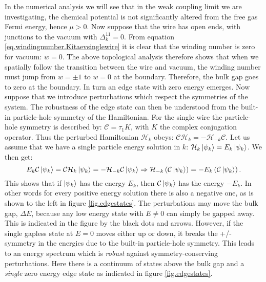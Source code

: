 In the numerical analysis we will see that in the weak coupling limit we are investigating, the chemical potential is not significantly altered from the free gas Fermi energy, hence $\mu > 0$. Now suppose that the wire has open ends, with junctions to the vacuum with $\Delta^{11}_k = 0$. From equation \eqref{eq.windingnumber.Kitaevsinglewire} it is clear that the winding number is zero for vacuum: $w = 0$. The above topological analysis therefore shows that when we spatially follow the transition between the wire and vacuum, the winding number must jump from $w = \pm 1$ to $w = 0$ at the boundary. Therefore, the bulk gap goes to zero at the boundary. In turn an edge state with zero energy emerges. Now suppose that we introduce perturbations which respect the symmetries of the system. The robustness of the edge state can then be understood from the built-in particle-hole symmetry of the Hamiltonian. For the single wire the particle-hole symmetry is described by: $\mathcal{C} = \tau_1 K$, with $K$ the complex conjugation operator. Thus the perturbed Hamiltonian $\mathcal{H}_k$ obeys: $\mathcal{C}\mathcal{H}_{k} = -\mathcal{H}_{-k}\mathcal{C}$. Let us assume that we have a single particle energy solution in $k$: $\mathcal{H}_{k}\ket{\psi_k} = E_k\ket{\psi_k}$. We then get:
\begin{equation}
E_k\mathcal{C}\ket{\psi_k} = \mathcal{C}\mathcal{H}_{k}\ket{\psi_k} = -\mathcal{H}_{-k}\mathcal{C}\ket{\psi_k} \Rightarrow \mathcal{H}_{-k}\left(\mathcal{C}\ket{\psi_k}\right) = -E_k\left(\mathcal{C}\ket{\psi_k}\right).
\end{equation}
This shows that if $\ket{\psi_k}$ has the energy $E_k$, then $\mathcal{C}\ket{\psi_k}$ has the energy $-E_k$. In other words for every positive energy solution there is also a negative one, as is shown to the left in figure \ref{fig.edgestates}. The perturbations may move the bulk gap, $\Delta E$, because any low energy state with $E \neq 0 $ can simply be gapped away. This is indicated in the figure by the black dots and arrows. However, if the single gapless state at $E = 0$ moves either up or down, it breaks the +/- symmetry in the energies due to the built-in particle-hole symmetry. This leads to an energy spectrum which is \textit{robust} against symmetry-conserving perturbations. Here there is a continuum of states above the bulk gap and a \textit{single} zero energy edge state as indicated in figure \ref{fig.edgestates}. 


